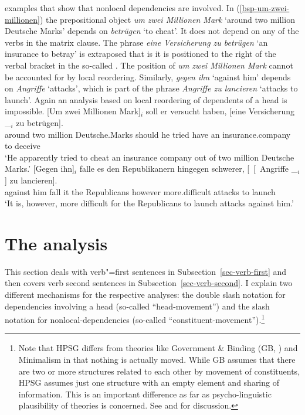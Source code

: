 examples that show that nonlocal dependencies are involved. In (\ref{bsp-um-zwei-millionen}) the
prepositional object \emph{um zwei Millionen Mark} `around two million Deutsche Marks' depends on
\emph{betrügen} `to cheat'. It does not
depend on any of the verbs in the matrix clause. The phrase \emph{eine Versicherung zu betrügen} `an
insurance to betray' is extraposed that is it is positioned to the right of the verbal bracket in the so-called \nf. The
position of \emph{um zwei Millionen Mark} cannot be accounted for by local reordering. Similarly,
\emph{gegen ihn} `against him' depends on \emph{Angriffe} `attacks', which is part of the phrase \emph{Angriffe zu
  lancieren} `attacks to launch'. Again an analysis based on local reordering of dependents of a head is impossible.
\eal
\label{bsp-Fernabhaengigkeit}
\ex\label{bsp-um-zwei-millionen}
\gll {}[Um zwei Millionen Mark]$_i$ soll er versucht haben, [eine Versicherung \_$_i$ zu betrügen].\footnotemark\\
       \spacebr{}around two million Deutsche.Marks should he tried have \spacebr{}an insurance.company {} to deceive\\\german
{}
\glt `He apparently tried to cheat an insurance company out of two million Deutsche Marks.'
\ex
\gll {}[Gegen ihn]$_i$ falle es den Republikanern hingegen schwerer, [~[~Angriffe \_$_i$] zu lancieren].\footnotemark\\
	 {}\spacebr{}against him fall it the Republicans however more.difficult \hphantom{[~[~}attacks {} to launch\\
\glt `It is, however, more difficult for the Republicans to launch attacks against him.'
\zl



\section{The analysis}
\label{sec-analysis-verb-mevement}

This section deals with verb"=first sentences in Subsection~\ref{sec-verb-first} and then covers verb
second sentences in Subsection~\ref{sec-verb-second}. I explain two different mechanisms for the
respective analyses: the double slash notation for dependencies involving a head (so-called ``head-movement'') and the slash notation
for nonlocal-dependencies (so-called ``constituent-movement'').\footnote{
  Note that HPSG differs from theories like Government \& Binding (GB, \citealt{Chomsky81a}) and
  Minimalism \citep{Chomsky95a-u} in that nothing is
  actually moved. While GB assumes that there are two or more structures related to each other by
  movement of constituents, HPSG assumes just one structure with an empty element and sharing of
  information. This is an important difference as far as psycho-linguistic plausibility of theories
  is concerned. See  and  for discussion.
}

